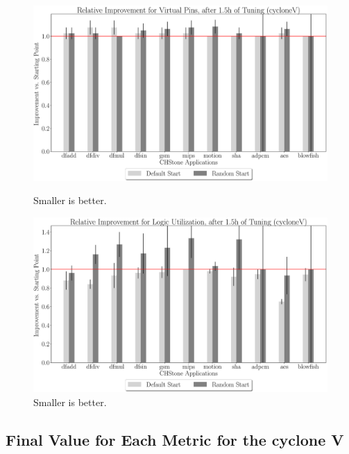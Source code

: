 \documentclass[12pt, a4paper]{article}
\begin{document}
\begin{figure}[htpb]
    \begin{minipage}{.48\textwidth}
        \centering
        \includegraphics[width=.8\textwidth]{rel_comp_pins_5400_chstone_cycloneV}
        \caption{Smaller is better.}
    \end{minipage}%
    \begin{minipage}{.48\textwidth}
        \centering
        \includegraphics[width=.8\textwidth]{rel_comp_lu_5400_chstone_cycloneV}
        \caption{Smaller is better.}
    \end{minipage}%
\end{figure}

\clearpage

\subsection{Final Value for Each Metric for the cyclone V}
\end{document}
